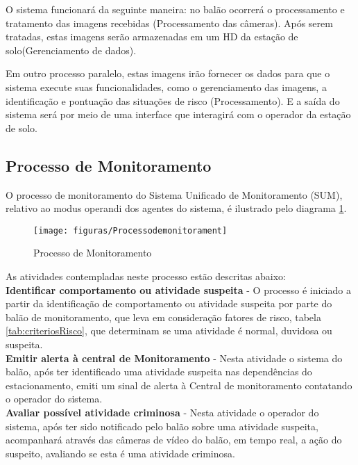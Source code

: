 O sistema funcionará da seguinte maneira: no balão ocorrerá o processamento e tratamento das imagens recebidas (Processamento das câmeras). Após serem tratadas, estas imagens serão armazenadas em um HD da estação de solo(Gerenciamento de dados).

Em outro processo paralelo, estas imagens  irão fornecer os dados para que o sistema execute suas funcionalidades, como o gerenciamento das imagens, a identificação e pontuação das situações de risco (Processamento). E a saída do sistema será por meio de uma interface que interagirá com o operador da estação de solo.

\subsection{Processo de Monitoramento}
O processo de monitoramento do Sistema Unificado de Monitoramento (SUM), relativo ao modus operandi dos agentes do sistema, é ilustrado pelo diagrama \ref{img:Processo de Monitoramento}.

\begin{figure}[]
\centering
\caption{Processo de Monitoramento}
\texttt{[image: figuras/Processodemonitorament]}
\label{img:Processo de Monitoramento}
\end{figure}
As atividades contempladas neste processo estão descritas abaixo:
\\

\textbf{Identificar comportamento ou atividade suspeita} - O processo é iniciado a partir da identificação de comportamento ou atividade suspeita por parte do balão de monitoramento, que leva em consideração fatores de risco, tabela \ref{tab:criteriosRisco}, que determinam se uma atividade é normal, duvidosa ou suspeita.
\\

\textbf{Emitir alerta à central de Monitoramento} - Nesta atividade o sistema do balão, após ter identificado uma atividade suspeita nas dependências do estacionamento, emiti um sinal de alerta à Central de monitoramento contatando o operador do sistema.
\\

\textbf{Avaliar possível atividade criminosa} - Nesta atividade o operador do sistema, após ter sido notificado pelo balão sobre uma atividade suspeita, acompanhará através das câmeras de vídeo do balão, em tempo real, a ação do suspeito, avaliando se esta é uma atividade criminosa.
\\

